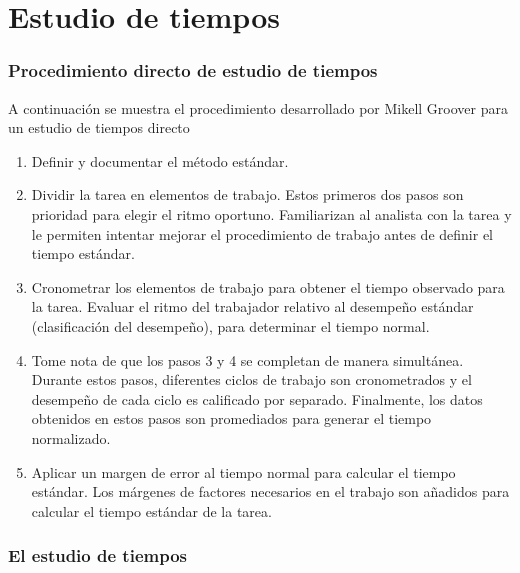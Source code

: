 \documentclass[../main]{subfiles}
\begin{document}
\chapter{Estudio de tiempos}

\subsection{Procedimiento directo de estudio de tiempos}
A continuación se muestra el procedimiento desarrollado por Mikell
Groover para un estudio de tiempos directo
\begin{enumerate}

  \item  Definir y documentar el método estándar.
  \item  Dividir la tarea en elementos de trabajo. Estos primeros dos
    pasos son prioridad para elegir el ritmo oportuno. Familiarizan
    al analista con la tarea y le permiten intentar mejorar el
    procedimiento de trabajo antes de definir el tiempo estándar.
  \item  Cronometrar los elementos de trabajo para obtener el tiempo
    observado para la tarea.
    Evaluar el ritmo del trabajador relativo al desempeño estándar
    (clasificación del desempeño), para determinar el tiempo normal.
  \item Tome nota de que los pasos 3 y 4 se completan de manera
    simultánea. Durante estos pasos, diferentes ciclos de trabajo son
    cronometrados y el desempeño de cada ciclo es calificado por
    separado. Finalmente, los datos obtenidos en estos pasos son
    promediados para generar el tiempo normalizado.
  \item  Aplicar un margen de error al tiempo normal para calcular el
    tiempo estándar. Los márgenes de factores necesarios en el
    trabajo son añadidos para calcular el tiempo estándar de la tarea.

\end{enumerate}
\subsection{El estudio de tiempos}
\end{document}
